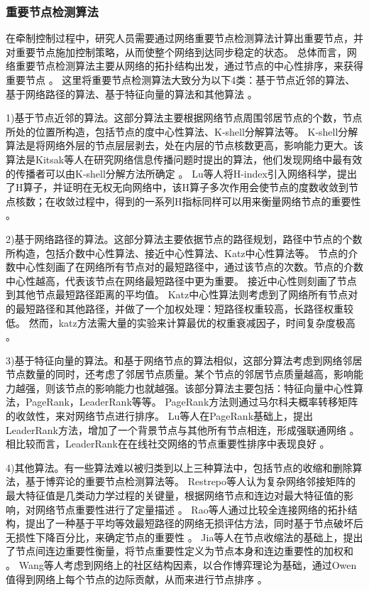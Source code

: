 \subsubsection{重要节点检测算法}

在牵制控制过程中，研究人员需要通过网络重要节点检测算法计算出重要节点，并对重要节点施加控制策略，从而使整个网络到达同步稳定的状态。
总体而言，网络重要节点检测算法主要从网络的拓扑结构出发，通过节点的中心性排序，来获得重要节点 \cite{Lue2016a}。
这里将重要节点检测算法大致分为以下4类：基于节点近邻的算法、基于网络路径的算法、基于特征向量的算法和其他算法 \cite{任晓龙2014}。

1)基于节点近邻的算法。这部分算法主要根据网络节点周围邻居节点的个数，节点所处的位置所构造，包括节点的度中心性算法、K-shell分解算法等。
K-shell分解算法是将网络外层的节点层层剥去，处在内层的节点核数更高，影响能力更大。该算法是Kitsak等人在研究网络信息传播问题时提出的算法，他们发现网络中最有效的传播者可以由K-shell分解方法所确定 \cite{Kitsak2010}。
Lu等人将H-index引入网络科学，提出了H算子，并证明在无权无向网络中，该H算子多次作用会使节点的度数收敛到节点核数；在收敛过程中，得到的一系列H指标同样可以用来衡量网络节点的重要性 \cite{Lue2016}。

2)基于网络路径的算法。这部分算法主要依据节点的路径规划，路径中节点的个数所构造，包括介数中心性算法、接近中心性算法、Katz中心性算法等。
节点的介数中心性刻画了在网络所有节点对的最短路径中，通过该节点的次数。节点的介数中心性越高，代表该节点在网络最短路径中更为重要。
接近中心性则刻画了节点到其他节点最短路径距离的平均值。
Katz中心性算法则考虑到了网络所有节点对的最短路径和其他路径，并做了一个加权处理：短路径权重较高，长路径权重较低。
然而，katz方法需大量的实验来计算最优的权重衰减因子，时间复杂度极高 \cite{Benzi2013}。

3)基于特征向量的算法。和基于网络节点的算法相似，这部分算法考虑到网络邻居节点数量的同时，还考虑了邻居节点质量。某个节点的邻居节点质量越高，影响能力越强，则该节点的影响能力也就越强。该部分算法主要包括：特征向量中心性算法，PageRank，LeaderRank等等。
PageRank方法则通过马尔科夫概率转移矩阵的收敛性，来对网络节点进行排序。
Lu等人在PageRank基础上，提出LeaderRank方法，增加了一个背景节点与其他所有节点相连，形成强联通网络 \cite{Li2014}。相比较而言，LeaderRank在在线社交网络的节点重要性排序中表现良好 \cite{Su2015}。

4)其他算法。有一些算法难以被归类到以上三种算法中，包括节点的收缩和删除算法，基于博弈论的重要节点检测算法等。
Restrepo等人认为复杂网络邻接矩阵的最大特征值是几类动力学过程的关键量，根据网络节点和连边对最大特征值的影响，对网络节点重要性进行了定量描述 \cite{Restrepo2006}。
Rao等人通过比较全连接网络的拓扑结构，提出了一种基于平均等效最短路径的网络无损评估方法，同时基于节点破坏后无损性下降百分比，来确定节点的重要性 \cite{Rao2009}。
Jia等人在节点收缩法的基础上，提出了节点间连边重要性衡量，将节点重要性定义为节点本身和连边重要性的加权和 \cite{Jia-sheng2011}。
Wang等人考虑到网络上的社区结构因素，以合作博弈理论为基础，通过Owen值得到网络上每个节点的边际贡献，从而来进行节点排序 \cite{王学光2013}。

